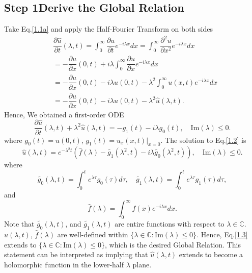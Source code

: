 \documentclass[12pt]{article}
\numberwithin{equation}{section}
\begin{document}
\subsection{Step 1\textemdash Derive the Global Relation}
\noindent Take Eq.\eqref{1.1a} and apply the Half-Fourier Transform on both sides
\begingroup
\allowdisplaybreaks
\begin{align*}
    &\dfrac{\partial \hat{u}}{\partial t}(\lambda,t)=\int_{0}^{\infty} \dfrac{\partial u}{\partial t}{e^{-i\lambda x}}dx=\int_{0}^{\infty}\dfrac{\partial^2 u}{\partial x^2} e^{-i\lambda x}dx\\
    &=-\dfrac{\partial u}{\partial x}(0,t)+i\lambda\int_{0}^{\infty} \dfrac{\partial u}{\partial x} e^{-i\lambda x} dx\\
    &=-\dfrac{\partial u}{\partial x}(0,t)-i\lambda u(0,t)-\lambda^2\int_{0}^{\infty} u(x,t)e^{-i\lambda x}dx\\
    &=-\dfrac{\partial u}{\partial x}(0,t)-i\lambda u(0,t)-\lambda^2\hat{u}(\lambda,t).
\end{align*}
Hence, We obtained a first-order ODE
\begin{equation}\label{1.2}
    \dfrac{\partial \hat{u}}{\partial t}(\lambda,t)+\lambda^2\hat{u}(\lambda,t)=-g_1(t)-i\lambda g_0(t),\quad \text{Im}(\lambda)\leqslant 0.
\end{equation}
where $g_0(t)=u(0,t)$, $g_1(t)=u_x(x,t)\vert_{x=0}$. The solution to Eq.\eqref{1.2} is
\begin{equation}\label{1.3}
    \hat{u}(\lambda,t)=e^{-\lambda^2 t}\left(\hat{f}(\lambda)-\tilde{g_1}(\lambda^2,t)-i\lambda\tilde{g_0}(\lambda^2,t)\right),\quad \text{Im}(\lambda)\leqslant 0.
\end{equation}
where \begin{equation*}
    \tilde{g_0}(\lambda,t)=\int_{0}^{t} e^{\lambda \tau}g_0(\tau)d\tau, \quad \tilde{g_1}(\lambda,t)=\int_{0}^{t} e^{\lambda \tau}g_1(\tau)d\tau,
\end{equation*}
and $$\hat{f}(\lambda)=\int_{0}^{\infty} f(x)e^{-i\lambda x}dx.$$
Note that $\tilde{g_0}(\lambda,t)$, and $\tilde{g_1}(\lambda,t)$ are entire functions with respect to $\lambda\in\mathbb{C}$. $\hat{u}(\lambda,t)$, $\hat{f}(\lambda)$ are well-defined within $\{\lambda\in\mathbb{C}:\text{Im}(\lambda)\leqslant 0\}$. Hence, Eq.\eqref{1.3} extends to $\{\lambda\in\mathbb{C}:\text{Im}(\lambda)\leqslant 0\}$, which is the desired Global Relation. This statement can be interpreted as implying that $\hat{u}(\lambda,t)$ extends to become a holomorphic function in the lower-half $\lambda$ plane. \vspace{5mm}
\end{document}

